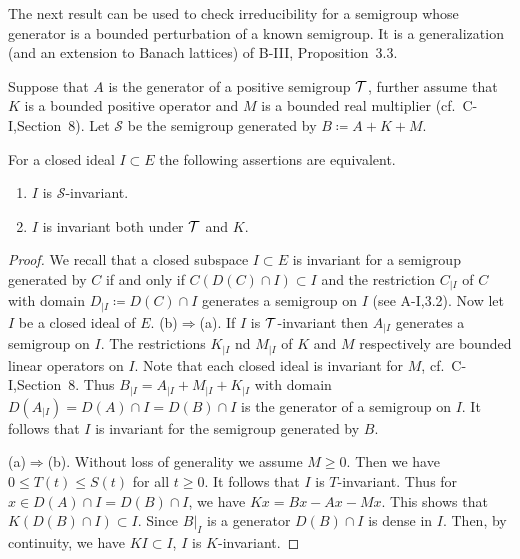 The next result can be used to check irreducibility for a semigroup whose generator is a bounded perturbation of a known semigroup. It is a generalization (and an extension to Banach lattices) of B-III, Proposition~3.3. 

\begin{proposition}\label{prop:c3-3.3}
	Suppose that $A$ is the generator of a positive semigroup $\mathcal{T}$, further assume that $K$ is a bounded positive operator and $M$ is a bounded real multiplier (cf.\ C-I,Section~8).
	Let $\mathcal{S}$ be the semigroup generated by $B \coloneqq A + K + M$.
	
	For a closed ideal $I \subset E$ the following assertions are equivalent.
	\begin{enumerate}[\upshape (a)]
		\item 
		$I$ is $\mathcal{S}$-invariant.
	
		\item 
		$I$ is invariant both under $\mathcal{T}$ and $K$.
	\end{enumerate}
\end{proposition}

\begin{proof}
We recall that a closed subspace $I \subset E$ is invariant for a semigroup generated by $C$ if and only if $C(D(C)\cap I) \subset I$ and the restriction $C_{|I}$ of $C$ with domain $D_{|I} \coloneqq D(C)\cap I$ generates a semigroup on $I$ (see A-I,3.2).
Now let $I$ be a closed ideal of $E$.
%
%
(b)$\Rightarrow$(a).
If $I$ is $\mathcal{T}$-invariant then $A_{|I}$ generates a semigroup on $I$.
The restrictions $K_{|I}$ nd $M_{|I}$ of $K$ and $M$ respectively are bounded linear operators on $I$.
Note that each closed ideal is invariant for $M$, cf.\ C-I,Section~8.
Thus $B_{|I} = A_{|I} + M_{|I} + K_{|I}$ with domain $D(A_{|I}) = D(A)\cap I = D(B)\cap I$ is the generator of a semigroup on $I$.
It follows that $I$ is invariant for the semigroup generated by $B$.

(a)$\Rightarrow$(b).
Without loss of generality we assume $M \geq 0$.
Then we have $0 \leq T(t) \leq S(t)$ for all $t \geq 0$.
It follows that $I$ is $T$-invariant.
Thus for $x \in D(A)\cap I = D(B)\cap I$, we have $Kx = Bx - Ax - Mx$.
This shows that $K(D(B)\cap I) \subset I$.
Since $B|_{I}$ is a generator $D(B)\cap I$ is dense in $I$.
Then, by continuity, we have $KI \subset I$, \ie  $I$ is $K$-invariant.
\end{proof}

